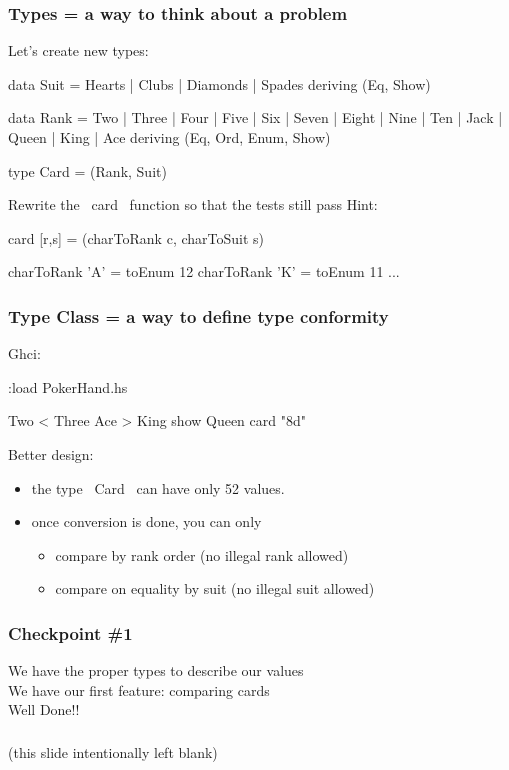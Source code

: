 \documentclass[11pt,xcolor={dvipsnames}]{beamer}
\newcommand{\tc}{\textcolor}
\newcommand{\key}[1]{\tc{orange}{#1}}
\newcommand{\rk}{\enskip{\key{$\hookleftarrow$}}}
\newcommand{\vs}{\vspace{1em}}
\begin{document}
\begin{frame}[fragile]
\frametitle{Types = a way to think about a problem}
Let's create new types:
\begin{haskell}
data Suit = Hearts | Clubs | Diamonds | Spades
    deriving (Eq, Show)

data Rank = Two | Three | Four | Five | Six | Seven | Eight 
          | Nine | Ten | Jack | Queen | King | Ace
    deriving (Eq, Ord, Enum, Show)

type Card = (Rank, Suit)
\end{haskell}
Rewrite the ~card~ function so that the tests still pass
\vs
Hint:
\begin{haskell}
card [r,s] = (charToRank c, charToSuit s)

charToRank 'A' = toEnum 12
charToRank 'K' = toEnum 11
...
\end{haskell}
\end{frame}
\begin{frame}[fragile]
\frametitle{Type Class = a way to define type conformity}
Ghci:
\begin{term}
:load PokerHand.hs\rk

Two < Three\rk
Ace > King\rk
show Queen\rk
card "8d"\rk
\end{term}
Better design:
\begin{itemize}
\item  the type ~Card~ can have only 52 values.
\item  once conversion is done, you can only
\begin{itemize}
\item compare by rank order (no illegal rank allowed)
\item compare on equality by suit (no illegal suit allowed)
\end{itemize}
\end{itemize}
\end{frame}
\begin{frame}[fragile]
\frametitle{Checkpoint \#1}
\begin{center}
We have the proper types to describe our values\\
\vs
We have our first feature: comparing cards\\
\vs
\Large{Well Done!!}
\end{center}
\end{frame}
\begin{frame}[fragile]
\frametitle{}
(this slide intentionally left blank)
\end{frame}
\end{document}
